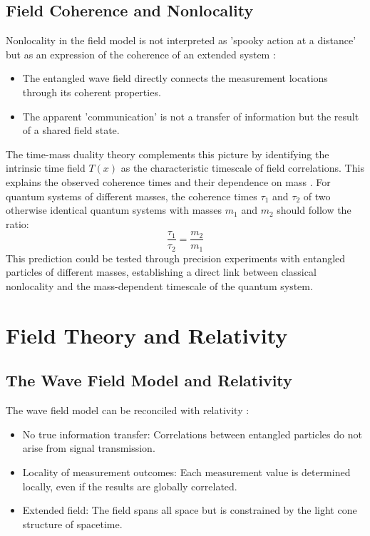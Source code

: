\documentclass[12pt,a4paper]{article}
\newcommand{\Tfield}{T(x)}
\begin{document}
	\subsection{Field Coherence and Nonlocality}
	Nonlocality in the field model is not interpreted as 'spooky action at a distance' but as an expression of the coherence of an extended system \cite{Zeilinger2010}\relax:
	\begin{itemize}
		\item The entangled wave field directly connects the measurement locations through its coherent properties.
		\item The apparent 'communication' is not a transfer of information but the result of a shared field state.
	\end{itemize}
	The time-mass duality theory complements this picture by identifying the intrinsic time field \(\Tfield\) as the characteristic timescale of field correlations. This explains the observed coherence times and their dependence on mass \cite{Pascher2024}\relax. For quantum systems of different masses, the coherence times \(\tau_1\) and \(\tau_2\) of two otherwise identical quantum systems with masses \(m_1\) and \(m_2\) should follow the ratio:
	\begin{equation}
		\frac{\tau_1}{\tau_2} = \frac{m_2}{m_1}
	\end{equation}
	This prediction could be tested through precision experiments with entangled particles of different masses, establishing a direct link between classical nonlocality and the mass-dependent timescale of the quantum system.
	
	\section{Field Theory and Relativity}
	\subsection{The Wave Field Model and Relativity}
	The wave field model can be reconciled with relativity \cite{Maudlin2011}\relax:
	\begin{itemize}
		\item No true information transfer: Correlations between entangled particles do not arise from signal transmission.
		\item Locality of measurement outcomes: Each measurement value is determined locally, even if the results are globally correlated.
		\item Extended field: The field spans all space but is constrained by the light cone structure of spacetime.
	\end{itemize}
	
\end{document}
